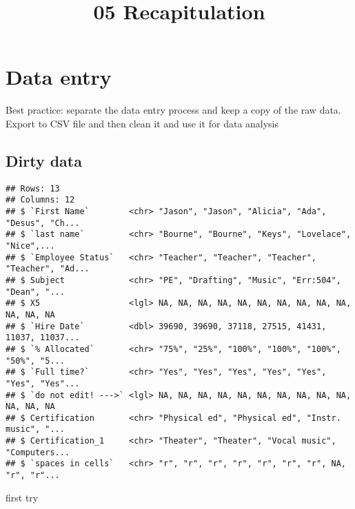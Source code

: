 \documentclass[
]{article}
\title{05 Recapitulation}
\author{}
\date{\vspace{-2.5em}}
\begin{document}
\maketitle

\hypertarget{data-entry}{%
\section{Data entry}\label{data-entry}}

Best practice: separate the data entry process and keep a copy of the
raw data. Export to CSV file and then clean it and use it for data
analysis

\hypertarget{dirty-data}{%
\subsection{Dirty data}\label{dirty-data}}

\begin{verbatim}
## Rows: 13
## Columns: 12
## $ `First Name`        <chr> "Jason", "Jason", "Alicia", "Ada", "Desus", "Ch...
## $ `last name`         <chr> "Bourne", "Bourne", "Keys", "Lovelace", "Nice",...
## $ `Employee Status`   <chr> "Teacher", "Teacher", "Teacher", "Teacher", "Ad...
## $ Subject             <chr> "PE", "Drafting", "Music", "Err:504", "Dean", "...
## $ X5                  <lgl> NA, NA, NA, NA, NA, NA, NA, NA, NA, NA, NA, NA, NA
## $ `Hire Date`         <dbl> 39690, 39690, 37118, 27515, 41431, 11037, 11037...
## $ `% Allocated`       <chr> "75%", "25%", "100%", "100%", "100%", "50%", "5...
## $ `Full time?`        <chr> "Yes", "Yes", "Yes", "Yes", "Yes", "Yes", "Yes"...
## $ `do not edit! --->` <lgl> NA, NA, NA, NA, NA, NA, NA, NA, NA, NA, NA, NA, NA
## $ Certification       <chr> "Physical ed", "Physical ed", "Instr. music", "...
## $ Certification_1     <chr> "Theater", "Theater", "Vocal music", "Computers...
## $ `spaces in cells`   <chr> "r", "r", "r", "r", "r", "r", "r", NA, "r", "r"...
\end{verbatim}

first try
\end{document}
